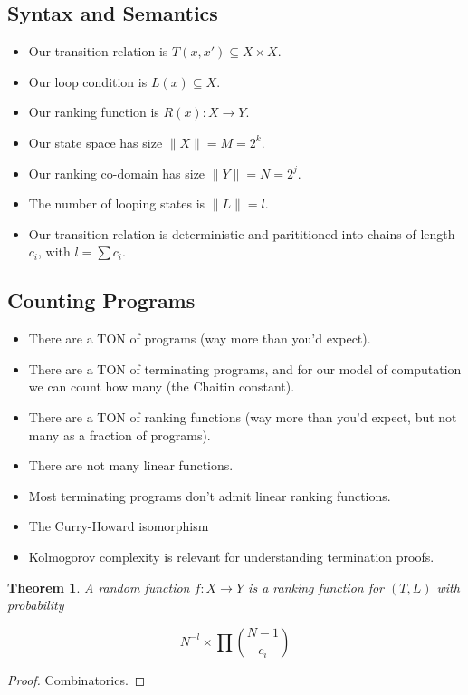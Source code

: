 \documentclass[preprint]{sigplanconf}
\newtheorem{theorem}{Theorem}
\theoremstyle{definition}
\begin{document}
\subsection{Syntax and Semantics}

\begin{itemize}
 \item Our transition relation is $T(x, x') \subseteq X \times X$.
 \item Our loop condition is $L(x) \subseteq X$.
 \item Our ranking function is $R(x) : X \to Y$.
 \item Our state space has size $\| X \| = M = 2^k$.
 \item Our ranking co-domain has size $\| Y \| = N = 2^j$.
 \item The number of looping states is $\| L \| = l$.
 \item Our transition relation is deterministic and parititioned into chains of length $c_i$, with $l = \sum c_i$.
\end{itemize}

\subsection{Counting Programs}
\begin{itemize}
 \item There are a TON of programs (way more than you'd expect).
 \item There are a TON of terminating programs, and for our model of computation we can count
  how many (the Chaitin constant).
 \item There are a TON of ranking functions (way more than you'd expect, but not many as a
  fraction of programs).
 \item There are not many linear functions.
 \item Most terminating programs don't admit linear ranking functions.
 \item The Curry-Howard isomorphism
 \item Kolmogorov complexity is relevant for understanding termination proofs.
\end{itemize}


\begin{theorem}
 A random function $f : X \to Y$ is a ranking function for $(T, L)$ with probability

 $$N^{-l} \times \prod {{N-1} \choose c_i}$$
\end{theorem}

\begin{proof}
 Combinatorics.
\end{proof}
\end{document}
